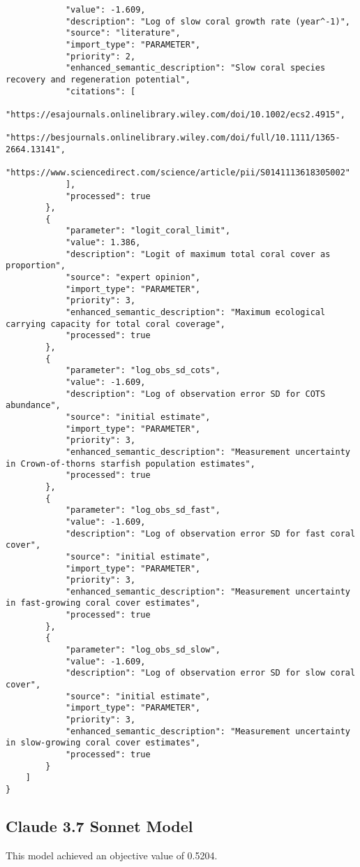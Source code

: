 \begin{lstlisting}
            "value": -1.609,
            "description": "Log of slow coral growth rate (year^-1)",
            "source": "literature",
            "import_type": "PARAMETER",
            "priority": 2,
            "enhanced_semantic_description": "Slow coral species recovery and regeneration potential",
            "citations": [
                "https://esajournals.onlinelibrary.wiley.com/doi/10.1002/ecs2.4915",
                "https://besjournals.onlinelibrary.wiley.com/doi/full/10.1111/1365-2664.13141",
                "https://www.sciencedirect.com/science/article/pii/S0141113618305002"
            ],
            "processed": true
        },
        {
            "parameter": "logit_coral_limit",
            "value": 1.386,
            "description": "Logit of maximum total coral cover as proportion",
            "source": "expert opinion",
            "import_type": "PARAMETER",
            "priority": 3,
            "enhanced_semantic_description": "Maximum ecological carrying capacity for total coral coverage",
            "processed": true
        },
        {
            "parameter": "log_obs_sd_cots",
            "value": -1.609,
            "description": "Log of observation error SD for COTS abundance",
            "source": "initial estimate",
            "import_type": "PARAMETER",
            "priority": 3,
            "enhanced_semantic_description": "Measurement uncertainty in Crown-of-thorns starfish population estimates",
            "processed": true
        },
        {
            "parameter": "log_obs_sd_fast",
            "value": -1.609,
            "description": "Log of observation error SD for fast coral cover",
            "source": "initial estimate",
            "import_type": "PARAMETER",
            "priority": 3,
            "enhanced_semantic_description": "Measurement uncertainty in fast-growing coral cover estimates",
            "processed": true
        },
        {
            "parameter": "log_obs_sd_slow",
            "value": -1.609,
            "description": "Log of observation error SD for slow coral cover",
            "source": "initial estimate",
            "import_type": "PARAMETER",
            "priority": 3,
            "enhanced_semantic_description": "Measurement uncertainty in slow-growing coral cover estimates",
            "processed": true
        }
    ]
}
\end{lstlisting}
\clearpage
\subsection{Claude 3.7 Sonnet Model}
This model achieved an objective value of 0.5204.

